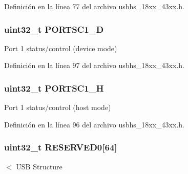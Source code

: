 Definición en la línea 77 del archivo usbhs\+\_\+18xx\+\_\+43xx.\+h.

\subsubsection[{\texorpdfstring{P\+O\+R\+T\+S\+C1\+\_\+D}{PORTSC1_D}}]{ uint32\+\_\+t P\+O\+R\+T\+S\+C1\+\_\+D}\hypertarget{struct_l_p_c___u_s_b_h_s___t_a3f95ae68d823fd2a4f4fc31381c092c5}{}\label{struct_l_p_c___u_s_b_h_s___t_a3f95ae68d823fd2a4f4fc31381c092c5}
Port 1 status/control (device mode) 

Definición en la línea 97 del archivo usbhs\+\_\+18xx\+\_\+43xx.\+h.

\subsubsection[{\texorpdfstring{P\+O\+R\+T\+S\+C1\+\_\+H}{PORTSC1_H}}]{ uint32\+\_\+t P\+O\+R\+T\+S\+C1\+\_\+H}\hypertarget{struct_l_p_c___u_s_b_h_s___t_a793643c9430524a34502b27c87132339}{}\label{struct_l_p_c___u_s_b_h_s___t_a793643c9430524a34502b27c87132339}
Port 1 status/control (host mode) 

Definición en la línea 96 del archivo usbhs\+\_\+18xx\+\_\+43xx.\+h.

\subsubsection[{\texorpdfstring{R\+E\+S\+E\+R\+V\+E\+D0}{RESERVED0}}]{ uint32\+\_\+t R\+E\+S\+E\+R\+V\+E\+D0\mbox{[}64\mbox{]}}\hypertarget{struct_l_p_c___u_s_b_h_s___t_af58c5fd1a07d6436db757863729ffc99}{}\label{struct_l_p_c___u_s_b_h_s___t_af58c5fd1a07d6436db757863729ffc99}
$<$ U\+SB Structure 

